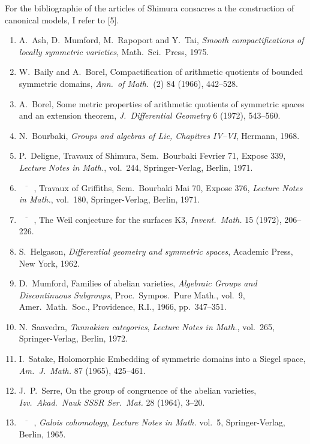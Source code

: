 \documentclass[12pt,a4paper]{article}
\theoremstyle{plain}
\theoremstyle{definition}
\theoremstyle{remark}
\begin{document}
For the bibliographie of the articles of Shimura consacres a the construction of canonical models, I refer to [5].

\begin{enumerate}[label=\arabic*., leftmargin=*]
\item A.~Ash, D.~Mumford, M.~Rapoport and Y.~Tai, \textit{Smooth compactifications of locally symmetric varieties}, Math.~Sci.~Press, 1975.

\item W.~Baily and A.~Borel, Compactification of arithmetic quotients of bounded symmetric domains, \textit{Ann.~of Math.}~(2) 84 (1966), 442--528.

\item A.~Borel, Some metric properties of arithmetic quotients of symmetric spaces and an extension theorem, \textit{J.~Differential Geometry} 6 (1972), 543--560.

\item N.~Bourbaki, \textit{Groups and algebras of Lie, Chapitres IV--VI}, Hermann, 1968.

\item P.~Deligne, Travaux of Shimura, Sem.~Bourbaki Fevrier 71, Expose 339, \textit{Lecture Notes in Math.}, vol.~244, Springer-Verlag, Berlin, 1971.

\item $\overline{\phantom{mm}}$, Travaux of Griffiths, Sem.~Bourbaki Mai 70, Expose 376, \textit{Lecture Notes in Math.}, vol.~180, Springer-Verlag, Berlin, 1971.

\item $\overline{\phantom{mm}}$, The Weil conjecture for the surfaces K3, \textit{Invent.~Math.} 15 (1972), 206--226.

\item S.~Helgason, \textit{Differential geometry and symmetric spaces}, Academic Press, New York, 1962.

\item D.~Mumford, Families of abelian varieties, \textit{Algebraic Groups and Discontinuous Subgroups}, Proc.~Sympos.~Pure Math., vol.~9, Amer.~Math.~Soc., Providence, R.I., 1966, pp.~347--351.

\item N.~Saavedra, \textit{Tannakian categories}, \textit{Lecture Notes in Math.}, vol.~265, Springer-Verlag, Berlin, 1972.

\item I.~Satake, Holomorphic Embedding of symmetric domains into a Siegel space, \textit{Am.~J.~Math.} 87 (1965), 425--461.

\item J.~P.~Serre, On the group of congruence of the abelian varieties, \textit{Izv.~Akad.~Nauk SSSR Ser.~Mat.} 28 (1964), 3--20.

\item $\overline{\phantom{mm}}$, \textit{Galois cohomology}, \textit{Lecture Notes in Math.} vol.~5, Springer-Verlag, Berlin, 1965.
\end{enumerate}
\end{document}
